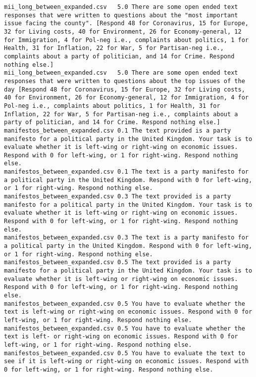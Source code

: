 \begin{lstlisting}[label=lst:promptvariants]
mii_long_between_expanded.csv	5.0	There are some open ended text responses that were written to questions about the "most important issue facing the county". [Respond 48 for Coronavirus, 15 for Europe, 32 for Living costs, 40 for Environment, 26 for Economy-general, 12 for Immigration, 4 for Pol-neg i.e., complaints about politics, 1 for Health, 31 for Inflation, 22 for War, 5 for Partisan-neg i.e., complaints about a party of politician, and 14 for Crime. Respond nothing else.]
mii_long_between_expanded.csv	5.0	There are some open ended text responses that were written to questions about the top issues of the day [Respond 48 for Coronavirus, 15 for Europe, 32 for Living costs, 40 for Environment, 26 for Economy-general, 12 for Immigration, 4 for Pol-neg i.e., complaints about politics, 1 for Health, 31 for Inflation, 22 for War, 5 for Partisan-neg i.e., complaints about a party of politician, and 14 for Crime. Respond nothing else.]
manifestos_between_expanded.csv	0.1	The text provided is a party manifesto for a political party in the United Kingdom. Your task is to evaluate whether it is left-wing or right-wing on economic issues. Respond with 0 for left-wing, or 1 for right-wing. Respond nothing else.
manifestos_between_expanded.csv	0.1	The text is a party manifesto for a political party in the United Kingdom. Respond with 0 for left-wing, or 1 for right-wing. Respond nothing else.
manifestos_between_expanded.csv	0.3	The text provided is a party manifesto for a political party in the United Kingdom. Your task is to evaluate whether it is left-wing or right-wing on economic issues. Respond with 0 for left-wing, or 1 for right-wing. Respond nothing else.
manifestos_between_expanded.csv	0.3	The text is a party manifesto for a political party in the United Kingdom. Respond with 0 for left-wing, or 1 for right-wing. Respond nothing else.
manifestos_between_expanded.csv	0.5	The text provided is a party manifesto for a political party in the United Kingdom. Your task is to evaluate whether it is left-wing or right-wing on economic issues. Respond with 0 for left-wing, or 1 for right-wing. Respond nothing else.
manifestos_between_expanded.csv	0.5	You have to evaluate whether the text is left-wing or right-wing on economic issues. Respond with 0 for left-wing, or 1 for right-wing. Respond nothing else.
manifestos_between_expanded.csv	0.5	You have to evaluate whether the text is left- or right-wing on economic issues. Respond with 0 for left-wing, or 1 for right-wing. Respond nothing else.
manifestos_between_expanded.csv	0.5	You have to evaluate the text to see if it is left-wing or right-wing on economic issues. Respond with 0 for left-wing, or 1 for right-wing. Respond nothing else.

\end{lstlisting}
